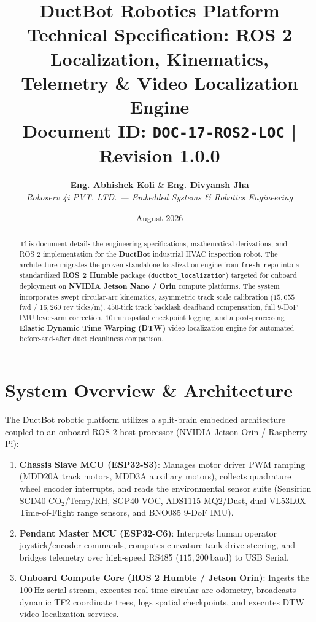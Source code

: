 \documentclass[11pt,a4paper]{article}
\title{
    \vspace{-1.5cm}
    \textbf{\Huge \color{primaryblue} DuctBot Robotics Platform} \\
    \vspace{0.3cm}
    \Large \textbf{Technical Specification: ROS 2 Localization, Kinematics, Telemetry \& Video Localization Engine} \\
    \vspace{0.2cm}
    \normalsize Document ID: \texttt{DOC-17-ROS2-LOC} \quad | \quad Revision 1.0.0
}
\author{
    \textbf{Eng. Abhishek Koli} \quad \& \quad \textbf{Eng. Divyansh Jha} \\
    \textit{Roboserv 4i PVT. LTD. --- Embedded Systems \& Robotics Engineering}
}
\date{August 2026}
\begin{document}
\maketitle
\thispagestyle{fancy}

\begin{abstract}
This document details the engineering specifications, mathematical derivations, and ROS 2 implementation for the \textbf{DuctBot} industrial HVAC inspection robot. The architecture migrates the proven standalone localization engine from \texttt{fresh\_repo} into a standardized \textbf{ROS 2 Humble} package (\texttt{ductbot\_localization}) targeted for onboard deployment on \textbf{NVIDIA Jetson Nano / Orin} compute platforms. The system incorporates swept circular-arc kinematics, asymmetric track scale calibration ($15,055$ fwd / $16,260$ rev ticks/m), $450$-tick track backlash deadband compensation, full 9-DoF IMU lever-arm correction, $10\,\text{mm}$ spatial checkpoint logging, and a post-processing \textbf{Elastic Dynamic Time Warping (DTW)} video localization engine for automated before-and-after duct cleanliness comparison.
\end{abstract}

\vspace{0.2cm}
\tableofcontents
\vspace{0.4cm}

\section{System Overview \& Architecture}

The DuctBot robotic platform utilizes a split-brain embedded architecture coupled to an onboard ROS 2 host processor (NVIDIA Jetson Orin / Raspberry Pi):

\begin{enumerate}
    \item \textbf{Chassis Slave MCU (ESP32-S3)}: Manages motor driver PWM ramping (MDD20A track motors, MDD3A auxiliary motors), collects quadrature wheel encoder interrupts, and reads the environmental sensor suite (Sensirion SCD40 $\text{CO}_2$/Temp/RH, SGP40 VOC, ADS1115 MQ2/Dust, dual VL53L0X Time-of-Flight range sensors, and BNO085 9-DoF IMU).
    \item \textbf{Pendant Master MCU (ESP32-C6)}: Interprets human operator joystick/encoder commands, computes curvature tank-drive steering, and bridges telemetry over high-speed RS485 ($115,200\,\text{baud}$) to USB Serial.
    \item \textbf{Onboard Compute Core (ROS 2 Humble / Jetson Orin)}: Ingests the 100\,Hz serial stream, executes real-time circular-arc odometry, broadcasts dynamic TF2 coordinate trees, logs spatial checkpoints, and executes DTW video localization services.
\end{enumerate}
\end{document}
